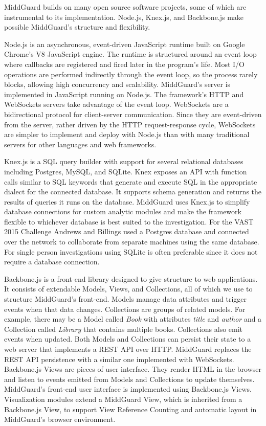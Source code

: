 \documentclass[midd]{thesis}
\begin{document}
MiddGuard builds on many open source software projects, some of which are
instrumental to its implementation. Node.js, Knex.js, and Backbone.js make
possible MiddGuard's structure and flexibility.

Node.js \cite{nodejs} is an asynchronous, event-driven JavaScript runtime built
on Google Chrome's V8 JavaScript engine. The runtime is structured around an
event loop where callbacks are registered and fired later in the program's life.
Most I/O operations are performed indirectly through the event loop, so the
process rarely blocks, allowing high concurrency and scalability. MiddGuard's
server is implemented in JavaScript running on Node.js. The framework's HTTP and
WebSockets servers take advantage of the event loop. WebSockets are a
bidirectional protocol for client-server communication. Since they are
event-driven from the server, rather driven by the HTTP request-response cycle,
WebSockets are simpler to implement and deploy with Node.js than with many
traditional servers for other languages and web frameworks.

Knex.js \cite{knexjs} is a SQL query builder with support for several relational
databases including Postgres, MySQL, and SQLite. Knex exposes an API with
function calls similar to SQL keywords that generate and execute SQL in the
appropriate dialect for the connected database. It supports schema generation
and returns the results of queries it runs on the database. MiddGuard uses
Knex.js to simplify database connections for custom analytic modules and make
the framework flexible to whichever database is best suited to the
investigation. For the VAST 2015 Challenge Andrews and Billings used a Postgres
database and connected over the network to collaborate from separate machines
using the same database. For single person investigations using SQLite is often
preferable since it does not require a database connection.

Backbone.js \cite{backbone} is a front-end library designed to give structure to
web applications. It consists of extendable Models, Views, and Collections, all
of which we use to structure MiddGuard's front-end. Models manage data
attributes and trigger events when that data changes. Collections are groups of
related models. For example, there may be a Model called \textit{Book} with
attributes \textit{title} and \textit{author} and a Collection called
\textit{Library} that contains multiple books. Collections also emit events when
updated. Both Models and Collections can persist their state to a web server
that implements a REST API over HTTP. MiddGuard replaces the REST API
persistence with a similar one implemented with WebSockets. Backbone.js Views
are pieces of user interface. They render HTML in the browser and listen to
events emitted from Models and Collections to update themselves. MiddGuard's
front-end user interface is implemented using Backbone.js Views. Visualization
modules extend a MiddGuard View, which is inherited from a Backbone.js View, to
support View Reference Counting and automatic layout in MiddGuard's browser
environment.
\end{document}
